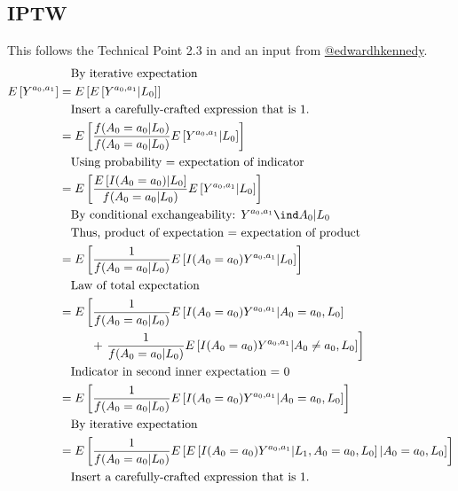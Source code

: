 \documentclass[dvipdfmx,10pt]{article}
\begin{document}
\subsection{IPTW}
\label{sec:orgdd14d2d}
This follows the Technical Point 2.3 in \cite{hernanCausalInference2019} and an input from \href{https://twitter.com/edwardhkennedy/status/1119305663564472320}{@edwardhkennedy}.
\begin{align*}
  &~~~\text{By iterative expectation}\\
  E\left[Y^{a_{0},a_{1}}\right]
  &= E\left[E\left[Y^{a_{0},a_{1}} | L_{0}\right]\right]\\
  &~~~\text{Insert a carefully-crafted expression that is 1.}\\
  &= E\left[\frac{f(A_{0}=a_{0} | L_{0})}{f(A_{0}=a_{0} | L_{0})} E\left[Y^{a_{0},a_{1}} | L_{0}\right]\right]\\
  &~~~\text{Using probability = expectation of indicator}\\
  &= E\left[\frac{E \left[ I(A_{0}=a_{0}) | L_{0} \right]}{f(A_{0}=a_{0} | L_{0})} E\left[Y^{a_{0},a_{1}} | L_{0}\right]\right]\\
  &~~~\text{By conditional exchangeability: } Y^{a_{0},a_{1}} \ind A_{0} | L_{0}\\
  &~~~\text{Thus, product of expectation = expectation of product}\\
  &= E\left[\frac{1}{f(A_{0}=a_{0} | L_{0})} E\left[I(A_{0}=a_{0})Y^{a_{0},a_{1}} | L_{0}\right]\right]\\
  &~~~\text{Law of total expectation}\\
  &= E\left[
    \frac{1}{f(A_{0}=a_{0} | L_{0})} E\left[I(A_{0}=a_{0})Y^{a_{0},a_{1}} | A_{0}=a_{0}, L_{0}\right]
    \right.\\
  &~~~~~~~~+\left.
    \frac{1}{f(A_{0}=a_{0} | L_{0})} E\left[I(A_{0}=a_{0})Y^{a_{0},a_{1}} | A_{0}\ne a_{0}, L_{0}\right]
    \right]\\
  &~~~\text{Indicator in second inner expectation = 0}\\
  &= E\left[\frac{1}{f(A_{0}=a_{0} | L_{0})} E\left[I(A_{0}=a_{0})Y^{a_{0},a_{1}} | A_{0} = a_{0}, L_{0}\right]\right]\\
  &~~~\text{By iterative expectation}\\
  &= E\left[\frac{1}{f(A_{0}=a_{0} | L_{0})} E\left[E\left[I(A_{0}=a_{0})Y^{a_{0},a_{1}} |L_{1}, A_{0} = a_{0}, L_{0}\right] | A_{0} = a_{0}, L_{0}\right]\right]\\
  &~~~\text{Insert a carefully-crafted expression that is 1.}\\

\end{align*}
\end{document}

